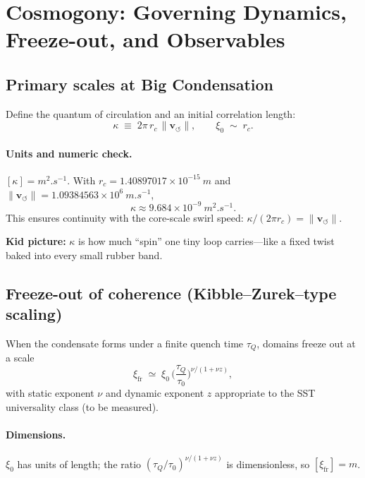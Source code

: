 \documentclass[10pt,reprint,aps,onecolumn,nofootinbib]{revtex4-2}
\newcommand{\rc}{r_c}
\newcommand{\vswirlval}{1.09384563\times 10^{6}\ \si{m.s^{-1}}}
\newcommand{\rcval}{1.40897017\times 10^{-15}\ \si{m}}
\begin{document}
\section*{Cosmogony: Governing Dynamics, Freeze-out, and Observables}

    \subsection*{Primary scales at Big Condensation}
        Define the quantum of circulation and an initial correlation length:
        \[
            \kappa \;\equiv\; 2\pi\,\rc\,\lVert \mathbf{v}_{\!\boldsymbol{\circlearrowleft}}\rVert,
            \qquad
            \xi_0 \;\sim\; \rc.
        \]
        \paragraph*{Units and numeric check.}
            \([ \kappa ] = \si{m^2.s^{-1}}\).
            With \(\rc=\rcval\) and \(\lVert \mathbf{v}_{\!\boldsymbol{\circlearrowleft}}\rVert=\vswirlval\),
            \[
                \kappa \approx 9.684\times 10^{-9}\ \si{m^2.s^{-1}}.
            \]
            This ensures continuity with the core-scale swirl speed: \( \kappa/(2\pi \rc)=\lVert \mathbf{v}_{\!\boldsymbol{\circlearrowleft}}\rVert\).

            \begin{analogynote}
            \textbf{Kid picture:} \(\kappa\) is how much ``spin'' one tiny loop carries—like a fixed twist baked into every small rubber band.
            \end{analogynote}

\subsection*{Freeze-out of coherence (Kibble--Zurek–type scaling)}
    When the condensate forms under a finite quench time \(\tau_Q\), domains freeze out at a scale
    \begin{equation}
    \xi_{\mathrm{fr}} \;\simeq\; \xi_0\,
    \Big(\frac{\tau_Q}{\tau_0}\Big)^{\nu/(1+\nu z)},
    \label{eq:kz}
    \end{equation}
    with static exponent \(\nu\) and dynamic exponent \(z\) appropriate to the SST universality class (to be measured). %
    \paragraph*{Dimensions.} \(\xi_0\) has units of length; the ratio \((\tau_Q/\tau_0)^{\nu/(1+\nu z)}\) is dimensionless, so \([\xi_{\mathrm{fr}}]=\si{m}\).
\end{document}
